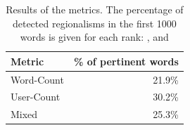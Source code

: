 \begin{table}[b]
\centering
\begin{tabular}{lr}
Metric                      &  \% of pertinent words  \\ %
\hline
Word-Count       &  21.9\%   \\
User-Count       &  30.2\%  \\
Mixed            &  25.3\%  \\ %
\hline
\end{tabular}
\caption{Results of the metrics. The percentage of detected regionalisms in the first 1000 words is given for each rank: \wordrank{}, \userrank{} and \mixedrank{} }
\label{tab:metric_results}
\end{table}


\newcommand{\tabinterspace}{\newline\newline}

